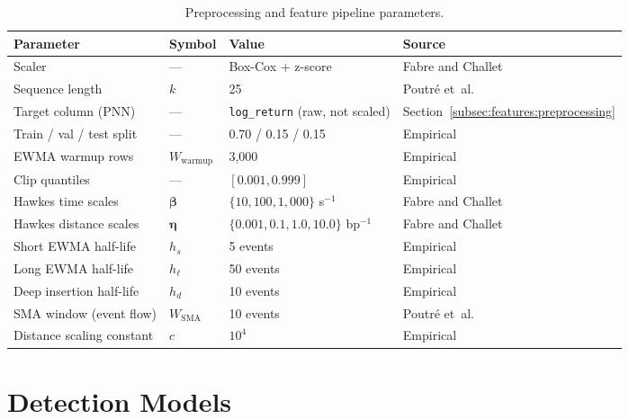 \documentclass[11pt]{report}
\begin{document}
\begin{table}[H]
\centering
\caption{Preprocessing and feature pipeline parameters.}
\label{tab:app_preprocessing}
\begin{tabular}{llll}
\toprule
\textbf{Parameter} & \textbf{Symbol} & \textbf{Value} & \textbf{Source} \\
\midrule
Scaler & --- & Box-Cox + z-score & Fabre and Challet~\cite{fabre_2025} \\
Sequence length & $k$ & 25 & Poutr\'e et~al.~\cite{poutre_2024} \\
Target column (PNN) & --- & \texttt{log\_return} (raw, not scaled) & Section~\ref{subsec:features:preprocessing} \\
Train / val / test split & --- & 0.70 / 0.15 / 0.15 & Empirical \\
EWMA warmup rows & $W_{\text{warmup}}$ & 3{,}000 & Empirical \\
Clip quantiles & --- & $[0.001, 0.999]$ & Empirical \\
Hawkes time scales & $\boldsymbol{\beta}$ & $\{10, 100, 1{,}000\}$ s$^{-1}$ & Fabre and Challet~\cite{fabre_2025} \\
Hawkes distance scales & $\boldsymbol{\eta}$ & $\{0.001, 0.1, 1.0, 10.0\}$ bp$^{-1}$ & Fabre and Challet~\cite{fabre_2025} \\
Short EWMA half-life & $h_s$ & 5 events & Empirical \\
Long EWMA half-life & $h_\ell$ & 50 events & Empirical \\
Deep insertion half-life & $h_d$ & 10 events & Empirical \\
SMA window (event flow) & $W_{\text{SMA}}$ & 10 events & Poutr\'e et~al.~\cite{poutre_2024} \\
Distance scaling constant & $c$ & $10^4$ & Empirical \\
\bottomrule
\end{tabular}
\end{table}

\section{Detection Models}\label{app:hyperparams:models}
\end{document}
